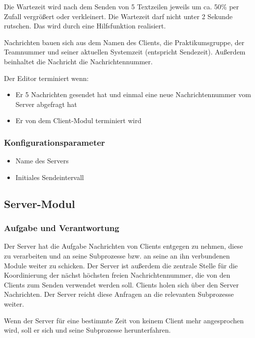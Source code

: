 \documentclass{article}
\begin{document}
Die Wartezeit wird nach dem Senden von 5 Textzeilen jeweils um ca. 50\% per Zufall vergrößert oder verkleinert.
Die Wartezeit darf nicht unter 2 Sekunde rutschen. Das wird durch eine Hilfsfunktion realisiert.

Nachrichten bauen sich aus dem Namen des Clients, die Praktikumsgruppe, der Teamnummer und seiner aktuellen Systemzeit
(entspricht Sendezeit). Außerdem beinhaltet die Nachricht die Nachrichtennummer.

Der Editor terminiert wenn:
\begin{itemize}
    \item Er 5 Nachrichten gesendet hat und einmal eine neue Nachrichtennummer vom Server abgefragt hat
    \item Er von dem Client-Modul terminiert wird 
\end{itemize}

\subsubsection{Konfigurationsparameter}
\begin{itemize}
    \item Name des Servers
    \item Initiales Sendeintervall
\end{itemize}

\newpage

\subsection{Server-Modul}
\subsubsection{Aufgabe und Verantwortung}
Der Server hat die Aufgabe Nachrichten von Clients entgegen zu nehmen, diese zu verarbeiten und an seine Subprozesse
bzw. an seine an ihn verbundenen Module weiter zu schicken. Der Server ist außerdem die zentrale Stelle für die
Koordinierung der nächst höchsten freien Nachrichtennummer, die von den Clients zum Senden verwendet werden soll.
Clients holen sich über den Server Nachrichten. Der Server reicht diese Anfragen an die relevanten Subprozesse weiter.

Wenn der Server für eine bestimmte Zeit von keinem Client mehr angesprochen wird, soll er sich und seine Subprozesse
herunterfahren.
\end{document}

